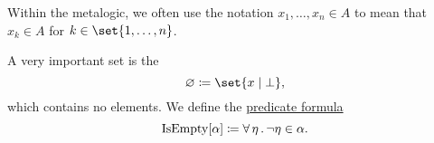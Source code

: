 \begin{remark}\label{rem:multile_set_membership_shorthand}
  Within the metalogic, we often use the notation \( x_1, \ldots, x_n \in A \) to mean that \( x_k \in A \) for \( k \in \set{ 1, \ldots, n } \).
\end{remark}

\begin{definition}\label{def:empty_set}
  A very important set is the 
  \begin{equation*}
    \varnothing \coloneqq \set{ x \given \bot },
  \end{equation*}
  which contains no elements. We define the \hyperref[rem:predicate_formula]{predicate formula}
  \begin{equation}\label{eq:def:empty_set/predicate}
    \operatorname{IsEmpty}[\alpha] \coloneqq \forall \thinspace \eta \thinspace . \thinspace \neg \eta \in \alpha.
  \end{equation}
\end{definition}

